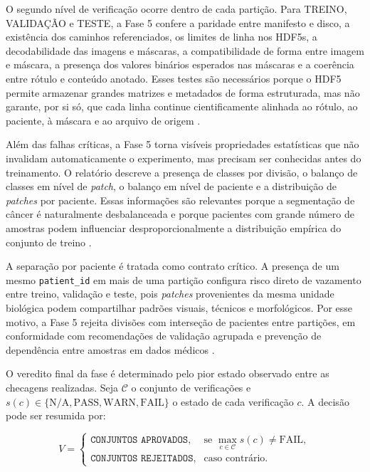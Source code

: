 O segundo nível de verificação ocorre dentro de cada partição. Para
TREINO, VALIDAÇÃO e TESTE, a Fase 5 confere a paridade
entre manifesto e disco, a existência dos caminhos referenciados, os limites de
linha nos HDF5s, a decodabilidade das imagens e máscaras, a compatibilidade de
forma entre imagem e máscara, a presença dos valores binários esperados nas
máscaras e a coerência entre rótulo e conteúdo anotado. Esses testes são
necessários porque o HDF5 permite armazenar grandes matrizes e metadados de forma
estruturada, mas não garante, por si só, que cada linha continue cientificamente
alinhada ao rótulo, ao paciente, à máscara e ao arquivo de origem
\cite{folk2011hdf5,yu2020noisy}.

Além das falhas críticas, a Fase 5 torna visíveis propriedades estatísticas que
não invalidam automaticamente o experimento, mas precisam ser conhecidas antes do
treinamento. O relatório descreve a presença de classes por divisão, o balanço de
classes em nível de \textit{patch}, o balanço em nível de paciente e a
distribuição de \textit{patches} por paciente. Essas informações são relevantes
porque a segmentação de câncer é naturalmente desbalanceada e porque pacientes
com grande número de amostras podem influenciar desproporcionalmente a
distribuição empírica do conjunto de treino \cite{he2009imbalanced}.

A separação por paciente é tratada como contrato crítico. A presença de um mesmo
\texttt{patient\_id} em mais de uma partição configura risco direto de vazamento
entre treino, validação e teste, pois \textit{patches} provenientes da mesma
unidade biológica podem compartilhar padrões visuais, técnicos e morfológicos.
Por esse motivo, a Fase 5 rejeita divisões com interseção de pacientes entre
partições, em conformidade com recomendações de validação agrupada e prevenção
de dependência entre amostras em dados médicos
\cite{roberts2017crossvalidation,dawood2026confounding}.

O veredito final da fase é determinado pelo pior estado observado entre as
checagens realizadas. Seja $\mathcal{C}$ o conjunto de verificações e
$s(c)\in\{\mathrm{N/A},\mathrm{PASS},\mathrm{WARN},\mathrm{FAIL}\}$ o estado de
cada verificação $c$. A decisão pode ser resumida por:

\begin{equation}
    V =
    \begin{cases}
        \texttt{CONJUNTOS\ APROVADOS}, & \text{se } \max_{c\in\mathcal{C}} s(c)
        \neq \mathrm{FAIL},\\
        \texttt{CONJUNTOS\ REJEITADOS}, & \text{caso contrário}.
    \end{cases}
    \label{eq:sanity_verdict}
\end{equation}

